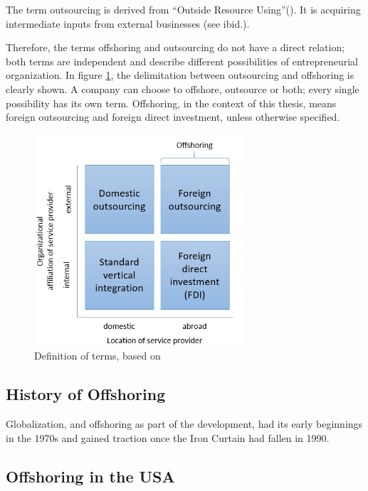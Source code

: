 The term outsourcing is derived from ``Outside Resource Using''(\cite[p. 46]{Specht.2007b}). It is acquiring intermediate inputs from external businesses (see ibid.).

Therefore, the terms offshoring and outsourcing do not have a direct relation; both terms are independent and describe different possibilities of entrepreneurial organization. In figure \ref{fig:DefTerms}, the delimitation between outsourcing and offshoring is clearly shown. A company can choose to offshore, outsource or both; every single possibility has its own term. Offshoring, in the context of this thesis, means foreign outsourcing and foreign direct investment, unless otherwise specified.

\begin{figure}[htb]
	\centering
	\includegraphics[width=0.7\textwidth]{Pictures/Terms_definition}
	\caption{Definition of terms, based on \cite[pp. 552f]{Antras.2004}}
	\label{fig:DefTerms}
\end{figure}

\subsection{History of Offshoring}
%
Globalization, and offshoring as part of the development, had its early beginnings in the 1970s and gained traction once the Iron Curtain had fallen in 1990.

\subsection{Offshoring in the USA}

